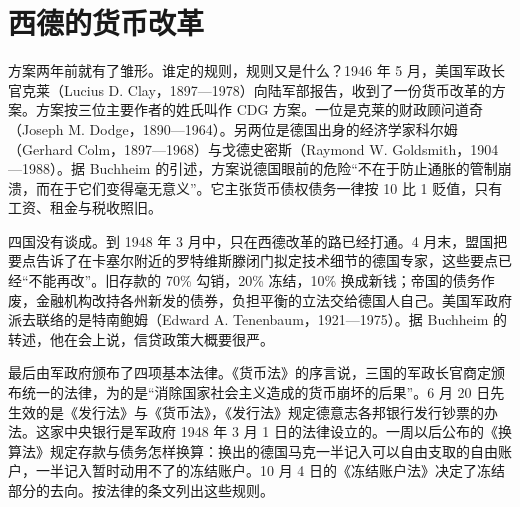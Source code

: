 \section{西德的货币改革}\label{sec:reconstruction-germany}

方案两年前就有了雏形。谁定的规则，规则又是什么？1946 年 5 月，美国军政长官克莱（Lucius D. Clay，1897—1978）向陆军部报告，收到了一份货币改革的方案\cite{buchheim1988,loc35}。方案按三位主要作者的姓氏叫作 CDG 方案\cite{buchheim1988}。一位是克莱的财政顾问道奇（Joseph M. Dodge，1890—1964）\cite{buchheim1988,loc35}。另两位是德国出身的经济学家科尔姆（Gerhard Colm，1897—1968）与戈德史密斯（Raymond W. Goldsmith，1904—1988）\cite{buchheim1988,loc35}。据 Buchheim 的引述，方案说德国眼前的危险“不在于防止通胀的管制崩溃，而在于它们变得毫无意义”\cite{buchheim1988}。它主张货币债权债务一律按 10 比 1 贬值，只有工资、租金与税收照旧\cite{buchheim1988}。

四国没有谈成。到 1948 年 3 月中，只在西德改革的路已经打通\cite{buchheim1988}。4 月末，盟国把要点告诉了在卡塞尔附近的罗特维斯滕闭门拟定技术细节的德国专家，这些要点已经“不能再改”\cite{buchheim1988}。旧存款的 70\% 勾销，20\% 冻结，10\% 换成新钱；帝国的债务作废，金融机构改持各州新发的债券，负担平衡的立法交给德国人自己\cite{buchheim1988}。美国军政府派去联络的是特南鲍姆（Edward A. Tenenbaum，1921—1975）\cite{buchheim1988,loc35}。据 Buchheim 的转述，他在会上说，信贷政策大概要很严\cite{buchheim1988}。

最后由军政府颁布了四项基本法律\cite{buchheim1988}。《货币法》的序言说，三国的军政长官商定颁布统一的法律，为的是“消除国家社会主义造成的货币崩坏的后果”\cite{waehrungsgesetz1948}。6 月 20 日先生效的是《发行法》与《货币法》，《发行法》规定德意志各邦银行发行钞票的办法\cite{buchheim1988}。这家中央银行是军政府 1948 年 3 月 1 日的法律设立的\cite{bdlgesetz1948}。一周以后公布的《换算法》规定存款与债务怎样换算：换出的德国马克一半记入可以自由支取的自由账户，一半记入暂时动用不了的冻结账户\cite{buchheim1988,umstellungsgesetz1948}。10 月 4 日的《冻结账户法》决定了冻结部分的去向\cite{buchheim1988,festkontogesetz1948}。按法律的条文列出这些规则。

